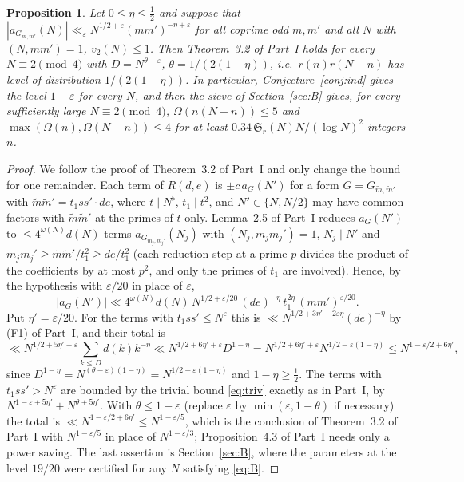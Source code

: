 ﻿\documentclass[11pt]{amsart}
\newtheorem{proposition}[theorem]{Proposition}
\theoremstyle{remark}
\newcommand{\Sg}{\mathfrak{S}}
\newcommand{\e}{\varepsilon}
\begin{document}
\begin{proposition}\label{prop:beyond}
Let $0\le\eta\le\frac12$ and suppose that $|a_{G_{m,m'}}(N)|\ll_\e N^{1/2+\e}(mm')^{-\eta+\e}$ for all coprime odd $m,m'$ and all $N$ with $(N,mm')=1$, $v_2(N)\le1$. Then Theorem~3.2 of Part~I holds for every $N\equiv2\pmod 4$ with $D=N^{\theta-\e}$, $\theta=1/(2(1-\eta))$, i.e.\ $r(n)r(N-n)$ has level of distribution $1/(2(1-\eta))$. In particular, Conjecture~\ref{conj:ind} gives the level $1-\e$ for every $N$, and then the sieve of Section~\ref{sec:B} gives, for every sufficiently large $N\equiv2\pmod4$, $\Omega(n(N-n))\le5$ and $\max(\Omega(n),\Omega(N-n))\le4$ for at least $0.34\,\Sg_r(N)N/(\log N)^2$ integers $n$.
\end{proposition}
\begin{proof}
We follow the proof of Theorem~3.2 of Part~I and only change the bound for one remainder. Each term of $R(d,e)$ is $\pm c\,a_{G}(N')$ for a form $G=G_{\tilde m,\tilde m'}$ with $\tilde m\tilde m'=t_1ss'\cdot de$, where $t\mid N^\flat$, $t_1\mid t^2$, and $N'\in\{N,N/2\}$ may have common factors with $\tilde m\tilde m'$ at the primes of $t$ only. Lemma~2.5 of Part~I reduces $a_G(N')$ to $\le4^{\omega(N)}d(N)$ terms $a_{G_{m_j,m_j'}}(N_j)$ with $(N_j,m_jm_j')=1$, $N_j\mid N'$ and $m_jm_j'\ge\tilde m\tilde m'/t_1^{2}\ge de/t_1^2$ (each reduction step at a prime $p$ divides the product of the coefficients by at most $p^2$, and only the primes of $t_1$ are involved). Hence, by the hypothesis with $\e/20$ in place of $\e$,
\[
|a_G(N')|\ll 4^{\omega(N)}d(N)\,N^{1/2+\e/20}\,(de)^{-\eta}\,t_1^{2\eta}\,(mm')^{\e/20}.
\]
Put $\eta'=\e/20$. For the terms with $t_1ss'\le N^\e$ this is $\ll N^{1/2+3\eta'+2\e\eta}(de)^{-\eta}$ by (F1) of Part~I, and their total is
\[
\ll N^{1/2+5\eta'+\e}\sum_{k\le D}d(k)k^{-\eta}\ll N^{1/2+6\eta'+\e}D^{1-\eta}=N^{1/2+6\eta'+\e}N^{1/2-\e(1-\eta)}\le N^{1-\e/2+6\eta'},
\]
since $D^{1-\eta}=N^{(\theta-\e)(1-\eta)}=N^{1/2-\e(1-\eta)}$ and $1-\eta\ge\frac12$. The terms with $t_1ss'>N^\e$ are bounded by the trivial bound \eqref{eq:triv} exactly as in Part~I, by $N^{1-\e+5\eta'}+N^{\theta+5\eta'}$. With $\theta\le1-\e$ (replace $\e$ by $\min(\e,1-\theta)$ if necessary) the total is $\ll N^{1-\e/2+6\eta'}\le N^{1-\e/5}$, which is the conclusion of Theorem~3.2 of Part~I with $N^{1-\e/5}$ in place of $N^{1-\e/3}$; Proposition~4.3 of Part~I needs only a power saving. The last assertion is Section~\ref{sec:B}, where the parameters at the level $19/20$ were certified for any $N$ satisfying \eqref{eq:B}.
\end{proof}
\end{document}
